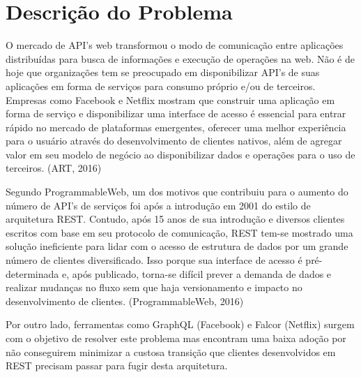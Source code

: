 \section[Descrição do Problema]{Descrição do Problema}

O mercado de API's web transformou o modo de comunicação entre aplicações distribuídas para busca de informações e execução de operações na web. Não é de hoje que organizações tem se preocupado em disponibilizar API's de suas aplicações em forma de serviços para consumo próprio e/ou de terceiros. Empresas como Facebook e Netflix mostram que construir uma aplicação em forma de serviço e disponibilizar uma interface de acesso é essencial para entrar rápido no mercado de plataformas emergentes, oferecer uma melhor experiência para o usuário através do desenvolvimento de clientes nativos, além de agregar valor em seu modelo de negócio ao disponibilizar dados e operações para o uso de terceiros. (ART, 2016)

Segundo ProgrammableWeb, um dos motivos que contribuiu para o aumento do número de API's de serviços foi após a introdução em 2001 do estilo de arquitetura REST. Contudo, após 15 anos de sua introdução e diversos clientes escritos com base em seu protocolo de comunicação, REST tem-se mostrado uma solução ineficiente para lidar com o acesso de estrutura de dados por um grande número de clientes diversificado. Isso porque sua interface de acesso é pré-determinada e, após publicado, torna-se difícil prever a demanda de dados e realizar mudanças no fluxo sem que haja versionamento e impacto no desenvolvimento de clientes. (ProgrammableWeb, 2016)

Por outro lado, ferramentas como GraphQL (Facebook) e Falcor (Netflix) surgem com o objetivo de resolver este problema mas encontram uma baixa adoção por não conseguirem minimizar a custosa transição que clientes desenvolvidos em REST precisam passar para fugir desta arquitetura.

